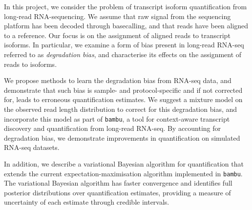 In this project, we consider the problem of transcript isoform quantification from long-read RNA-sequencing. We assume that raw signal from the sequencing platform has been decoded through basecalling, and that reads have been aligned to a reference. Our focus is on the assignment of aligned reads to transcript isoforms. In particular, we examine a form of bias present in long-read RNA-seq referred to as \textit{degradation bias}, and characterise its effects on the assignment of reads to isoforms. 

We propose methods to learn the degradation bias from RNA-seq data, and demonstrate that such bias is sample- and protocol-specific and if not corrected for, leads to erroneous quantification estimates. We suggest a mixture model on the observed read length distribution to correct for this degradation bias, and incorporate this model as part of \texttt{bambu}, a tool for context-aware transcript discovery and quantification from long-read RNA-seq. By accounting for degradation bias, we demonstrate improvements in quantification on simulated RNA-seq datasets. 

In addition, we describe a variational Bayesian algorithm for quantification that extends the current expectation-maximisation algorithm implemented in \texttt{bambu}. The variational Bayesian algorithm has faster convergence and identifies full posterior distributions over quantification estimates, providing a measure of uncertainty of each estimate through credible intervals.  

